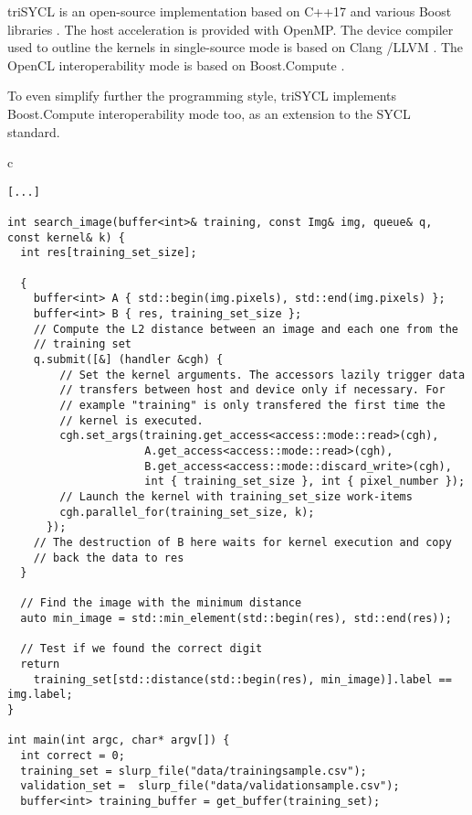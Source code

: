 \documentclass[sigplan]{acmart}
\begin{document}
triSYCL \cite{triSYCL} is an open-source implementation based on C++17
and various Boost libraries \cite{Boost-1.63}. The host acceleration
is provided with OpenMP. The device compiler used to outline the
kernels in single-source mode is based on Clang \cite{Clang-4.0}/LLVM
\cite{LLVM-4.0}. The OpenCL interoperability mode is based on
Boost.Compute \cite{Boost.Compute}.

To even simplify further the programming style, triSYCL
implements Boost.Compute interoperability mode too, as an extension to
the SYCL standard.


\begin{figure*}
  \begin{tabular}{c}
    \begin{lstlisting}[basicstyle=\scriptsize]
  [...]

int search_image(buffer<int>& training, const Img& img, queue& q, const kernel& k) {
  int res[training_set_size];

  {
    buffer<int> A { std::begin(img.pixels), std::end(img.pixels) };
    buffer<int> B { res, training_set_size };
    // Compute the L2 distance between an image and each one from the
    // training set
    q.submit([&] (handler &cgh) {
        // Set the kernel arguments. The accessors lazily trigger data
        // transfers between host and device only if necessary. For
        // example "training" is only transfered the first time the
        // kernel is executed.
        cgh.set_args(training.get_access<access::mode::read>(cgh),
                     A.get_access<access::mode::read>(cgh),
                     B.get_access<access::mode::discard_write>(cgh),
                     int { training_set_size }, int { pixel_number });
        // Launch the kernel with training_set_size work-items
        cgh.parallel_for(training_set_size, k);
      });
    // The destruction of B here waits for kernel execution and copy
    // back the data to res
  }

  // Find the image with the minimum distance
  auto min_image = std::min_element(std::begin(res), std::end(res));

  // Test if we found the correct digit
  return
    training_set[std::distance(std::begin(res), min_image)].label == img.label;
}

int main(int argc, char* argv[]) {
  int correct = 0;
  training_set = slurp_file("data/trainingsample.csv");
  validation_set =  slurp_file("data/validationsample.csv");
  buffer<int> training_buffer = get_buffer(training_set);


\end{lstlisting}
\end{tabular}
\end{figure*}
\end{document}

